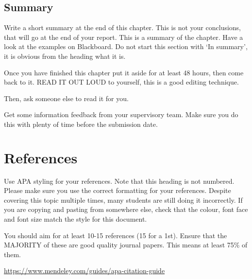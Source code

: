 \documentclass[a4paper,11pt]{bgwork}
\begin{document}
\subsection{Summary}
Write a short summary at the end of this chapter. This is not your conclusions, that will go at the end of your report. This is a summary of the chapter. Have a look at the examples on Blackboard. Do not start this section with ‘In summary’, it is obvious from the heading what it is.

Once you have finished this chapter put it aside for at least 48 hours, then come back to it. READ IT OUT LOUD to yourself, this is a good editing technique.

Then, ask someone else to read it for you.

Get some information feedback from your supervisory team. Make sure you do this with plenty of time before the submission date.


\section*{References}
Use APA styling for your references. Note that this heading is not numbered. Please make sure you use the correct formatting for your references. Despite covering this topic multiple times, many students are still doing it incorrectly. If you are copying and pasting from somewhere else, check that the colour, font face and font size match the style for this document.

You should aim for at least 10-15 references (15 for a 1st). Ensure that the MAJORITY of these are good quality journal papers. This means at least 75\% of them.

\url{https://www.mendeley.com/guides/apa-citation-guide}

\printbibliography
\end{document}
